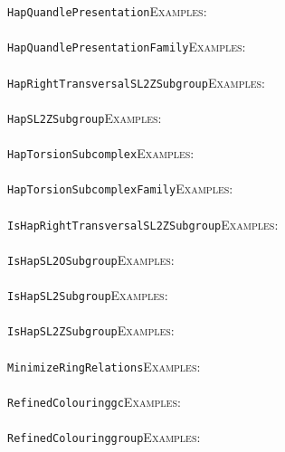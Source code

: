 \documentclass[a4paper,11pt]{report}
\begin{document}
{{ \texttt{HapQuandlePresentation}{\nobreakspace}{\nobreakspace}{\nobreakspace}{\nobreakspace}\textsc{Examples:} \\
 \\
 \texttt{HapQuandlePresentationFamily}{\nobreakspace}{\nobreakspace}{\nobreakspace}{\nobreakspace}\textsc{Examples:} \\
 \\
 \texttt{HapRightTransversalSL2ZSubgroup}{\nobreakspace}{\nobreakspace}{\nobreakspace}{\nobreakspace}\textsc{Examples:} \\
 \\
 \texttt{HapSL2ZSubgroup}{\nobreakspace}{\nobreakspace}{\nobreakspace}{\nobreakspace}\textsc{Examples:} \\
 \\
 \texttt{HapTorsionSubcomplex}{\nobreakspace}{\nobreakspace}{\nobreakspace}{\nobreakspace}\textsc{Examples:} \\
 \\
 \texttt{HapTorsionSubcomplexFamily}{\nobreakspace}{\nobreakspace}{\nobreakspace}{\nobreakspace}\textsc{Examples:} \\
 \\
 \texttt{IsHapRightTransversalSL2ZSubgroup}{\nobreakspace}{\nobreakspace}{\nobreakspace}{\nobreakspace}\textsc{Examples:} \\
 \\
 \texttt{IsHapSL2OSubgroup}{\nobreakspace}{\nobreakspace}{\nobreakspace}{\nobreakspace}\textsc{Examples:} \\
 \\
 \texttt{IsHapSL2Subgroup}{\nobreakspace}{\nobreakspace}{\nobreakspace}{\nobreakspace}\textsc{Examples:} \\
 \\
 \texttt{IsHapSL2ZSubgroup}{\nobreakspace}{\nobreakspace}{\nobreakspace}{\nobreakspace}\textsc{Examples:} \\
 \\
 \texttt{MinimizeRingRelations}{\nobreakspace}{\nobreakspace}{\nobreakspace}{\nobreakspace}\textsc{Examples:} \\
 \\
 \texttt{RefinedColouring{\textunderscore}gc}{\nobreakspace}{\nobreakspace}{\nobreakspace}{\nobreakspace}\textsc{Examples:} \\
 \\
 \texttt{RefinedColouring{\textunderscore}group}{\nobreakspace}{\nobreakspace}{\nobreakspace}{\nobreakspace}\textsc{Examples:} \\
 \\
}}
\end{document}
